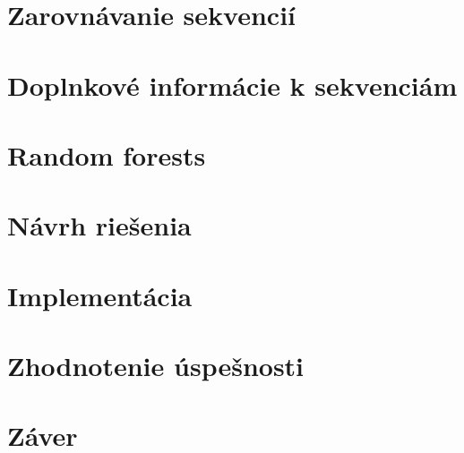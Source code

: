 

\chapter{Zarovnávanie sekvencií}
\chapter{Doplnkové informácie k sekvenciám}
\chapter{Random forests}
\chapter{Návrh riešenia}
\chapter{Implementácia}
\chapter{Zhodnotenie úspešnosti}
{}
\chapter*{Záver}
